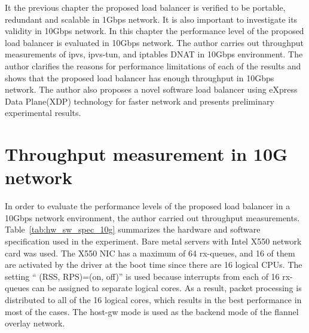 
It the previous chapter the proposed load balancer is verified to be portable, redundant and scalable in 1Gbps network.
It is also important to investigate its validity in 10Gbps network.
In this chapter the performance level of the proposed load balancer is evaluated in 10Gbps network.
The author carries out throughput measurements of ipvs, ipvs-tun, and iptables DNAT in 10Gbps environment.
The author clarifies the reasons for performance limitations of each of the results and shows that the proposed load balancer has enough throughput in 10Gbps network.
The author also proposes a novel software load balancer using eXpress Data Plane(XDP) technology for faster network and presents preliminary experimental results.

\section{Throughput measurement in 10G network}

In order to evaluate the performance levels of the proposed load balancer in a 10Gbps network environment, the author carried out throughput measurements.
Table~\ref{tab:hw_sw_spec_10g} summarizes the hardware and software specification used in the experiment.
Bare metal servers with Intel X550 network card was used.
The X550 NIC has a maximum of 64 rx-queues, and 16 of them are activated by the driver at the boot time since there are 16 logical CPUs.
The setting \enquote{ (RSS, RPS)=(on, off)} is used because interrupts from each of 16 rx-queues can be assigned to separate logical cores.
As a result, packet processing is distributed to all of the 16 logical cores, which results in the best performance in most of the cases.
The host-gw mode is used as the backend mode of the flannel overlay network.

